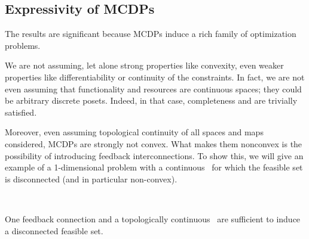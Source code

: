 \subsection{Expressivity of MCDPs}
The results are significant because MCDPs induce a rich family of
optimization problems.

We are not assuming, let alone strong properties like convexity, even
weaker properties like differentiability or continuity of the constraints.
In fact, we are not even assuming that functionality and resources
are continuous spaces; they could be arbitrary discrete posets.
Indeed, in that case, completeness and \scottcontinuity are trivially satisfied.


Moreover, even assuming topological continuity of all spaces and maps
considered, MCDPs are strongly not convex. What makes them nonconvex
is the possibility of introducing feedback interconnections. To show
this, we will give an example of a 1-dimensional problem with a continuous~\ftor
for which the feasible set is disconnected (and in particular non-convex).

\begin{marginfigure}
  \centering
  \\
  \caption{One feedback connection and a topologically continuous~\ftor
  are sufficient to induce a disconnected feasible set.}
  \label{fig:ceil-1}
\end{marginfigure}

\medskip{}


